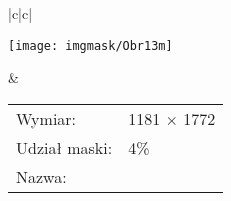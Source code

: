 \documentclass[12pt, twoside, openany]{report}
\theoremstyle{definition}
\begin{document}
\begin{longtable}[h!]{|c|c|}
    \begin{minipage}{.65\textwidth}
    \vspace{0.5cm}
    \centering
    \texttt{[image: imgmask/Obr13m]}
    \vspace{0.5cm}
    \end{minipage}
    &
    \begin{minipage}{.35\textwidth}
    \begin{tabular}{ l l  }
	Wymiar: & 1181 $\times$ 1772 \\
	Udział maski: & 4\% \\
	Nazwa: & \ObrXIIIm
    \end{tabular}
    \end{minipage} \\ \hline
    \caption{Obrazy poddane analizie.}
  \label{imgmasks}
\end{longtable}
\end{document}
